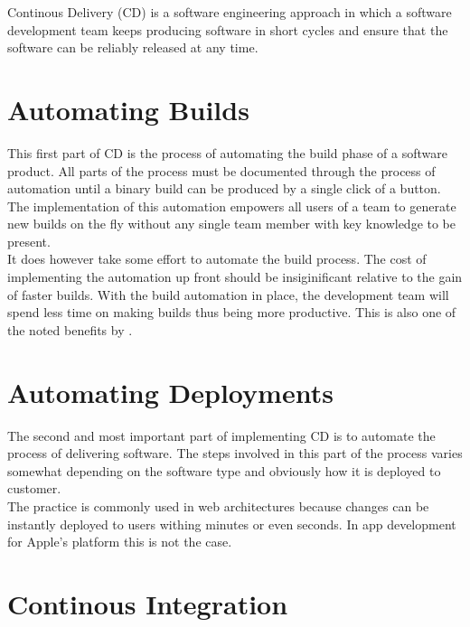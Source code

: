 \documentclass{ituthesis}
\begin{document}
Continous Delivery (CD) is a software engineering approach in which a software development team keeps producing software in short cycles and ensure that the software can be reliably released at any time. 


\section{Automating Builds}

This first part of CD is the process of automating the build phase of a software product. All parts of the process must be documented through the process of automation \cite{Osterweil1997} until a binary build can be produced by a single click of a button. The implementation of this automation empowers all users of a team to generate new builds on the fly without any single team member with key knowledge to be present.\\

It does however take some effort to automate the build process. The cost of implementing the automation up front should be insiginificant relative to the gain of faster builds. With the build automation in place, the development team will spend less time on making builds thus being more productive. This is also one of the noted benefits by \cite{Chen2015}.

\section{Automating Deployments}

The second and most important part of implementing CD is to automate the process of delivering software. The steps involved in this part of the process varies somewhat depending on the software type and obviously how it is deployed to customer.\\

The practice is commonly used in web architectures because changes can be instantly deployed to users withing minutes or even seconds. In app development for Apple's platform this is not the case. %

\section{Continous Integration}
\end{document}

